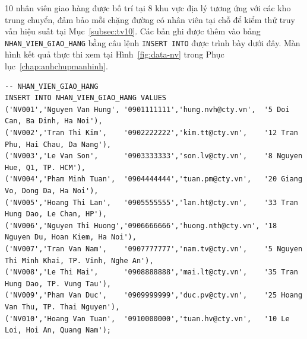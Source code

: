 \documentclass[11pt]{report}
\begin{document}
10 nhân viên giao hàng được bố trí tại 8 khu vực địa lý tương ứng với các kho trung chuyển, đảm bảo mỗi chặng đường có nhân viên tại chỗ để kiểm thử truy vấn hiệu suất tại Mục~\ref{subsec:tv10}. Các bản ghi được thêm vào bảng \texttt{NHAN\_VIEN\_GIAO\_HANG} bằng câu lệnh \texttt{INSERT INTO} được trình bày dưới đây. Màn hình kết quả thực thi xem tại Hình~\ref{fig:data-nv} trong Phục lục~\ref{chap:anhchupmanhinh}.

\begin{verbatim}
-- NHAN_VIEN_GIAO_HANG
INSERT INTO NHAN_VIEN_GIAO_HANG VALUES
('NV001','Nguyen Van Hung', '0901111111','hung.nvh@cty.vn',  '5 Doi Can, Ba Dinh, Ha Noi'),
('NV002','Tran Thi Kim',    '0902222222','kim.tt@cty.vn',    '12 Tran Phu, Hai Chau, Da Nang'),
('NV003','Le Van Son',      '0903333333','son.lv@cty.vn',    '8 Nguyen Hue, Q1, TP. HCM'),
('NV004','Pham Minh Tuan',  '0904444444','tuan.pm@cty.vn',   '20 Giang Vo, Dong Da, Ha Noi'),
('NV005','Hoang Thi Lan',   '0905555555','lan.ht@cty.vn',    '33 Tran Hung Dao, Le Chan, HP'),
('NV006','Nguyen Thi Huong','0906666666','huong.nth@cty.vn', '18 Nguyen Du, Hoan Kiem, Ha Noi'),
('NV007','Tran Van Nam',    '0907777777','nam.tv@cty.vn',    '5 Nguyen Thi Minh Khai, TP. Vinh, Nghe An'),
('NV008','Le Thi Mai',      '0908888888','mai.lt@cty.vn',    '35 Tran Hung Dao, TP. Vung Tau'),
('NV009','Pham Van Duc',    '0909999999','duc.pv@cty.vn',    '25 Hoang Van Thu, TP. Thai Nguyen'),
('NV010','Hoang Van Tuan',  '0910000000','tuan.hv@cty.vn',   '10 Le Loi, Hoi An, Quang Nam');
\end{verbatim}
\end{document}
